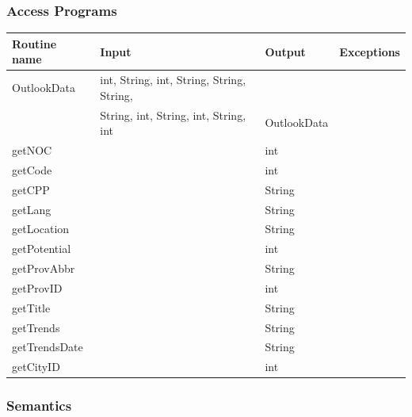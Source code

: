 \documentclass[12pt,fleqn]{article}
\begin{document}
\subsubsection* {Access Programs}
\begin{tabular}{| l | l | l | l |}
\hline
\textbf{Routine name} & \textbf{Input} & \textbf{Output} & \textbf{Exceptions}\\
\hline
OutlookData & int, String, int, String, String, String, \\&String,  int, String, int, String, int & OutlookData & ~\\
\hline
getNOC & ~ & int & ~\\
\hline
getCode & ~ & int & ~\\
\hline
getCPP & ~ & String & ~\\
\hline
getLang & ~ & String & ~\\
\hline
getLocation & ~ & String & ~\\
\hline
getPotential & ~ & int & ~\\
\hline
getProvAbbr & ~ & String & ~\\
\hline
getProvID & ~ & int & ~\\
\hline
getTitle & ~ & String & ~\\
\hline
getTrends & ~ & String & ~\\
\hline
getTrendsDate & ~ & String& ~\\
\hline
getCityID & ~ & int & ~\\
\hline
\end{tabular}

\subsubsection*{Semantics}
\end{document}
